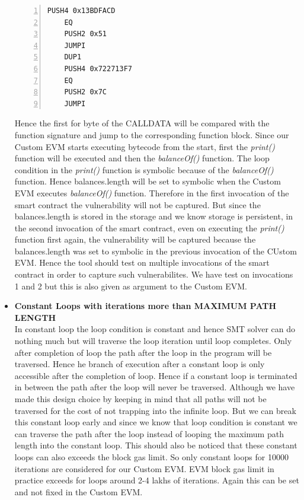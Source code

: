 \documentclass{article}
\begin{document}
\begin{itemize}
    \begin{Verbatim}[numbers=left,xleftmargin=5mm]
        PUSH4 0x13BDFACD 
	EQ 
	PUSH2 0x51 
	JUMPI 
	DUP1 
	PUSH4 0x722713F7 
	EQ 
	PUSH2 0x7C 
	JUMPI
    \end{Verbatim}
    Hence the first for byte of the CALLDATA will be compared with the function signature and jump to the corresponding function block. Since our Custom EVM starts executing bytecode from the start, first the \emph{print()} function will be executed and then the \emph{balanceOf()} function. The loop condition in the \emph{print()} function is symbolic because of the \emph{balanceOf()} function. Hence balances.length will be set to symbolic when the Custom EVM executes \emph{balanceOf()} function. Therefore in the first invocation of the smart contract the vulnerability will not be captured. But since the balances.length is stored in the storage and we know storage is persistent, in the second invocation of the smart contract, even on executing the \emph{print()} function first again, the vulnerability will be captured because the balances.length was set to symbolic in the previous invocation of the CUstom EVM. Hence the tool should test on multiple invocations of the smart contract in order to capture such vulnerabilites. We have test on invocations 1 and 2 but this is also given as argument to the Custom EVM.
    \item \textbf{Constant Loops with iterations more than MAXIMUM PATH LENGTH}\\
    In constant loop the loop condition is constant and hence SMT solver can do nothing much but will traverse the loop iteration until loop completes. Only after completion of loop the path after the loop in the program will be traversed. Hence he branch of execution after a constant loop is only accessible after the completion of loop. Hence if a constant loop is terminated in between the path after the loop will never be traversed. Although we have made this design choice by keeping in mind that all paths will not be traversed for the cost of not trapping into the infinite loop. But we can break this constant loop early and since we know that loop condition is constant we can traverse the path after the loop instead of looping the maximum path length into the constant loop.
    This should also be noticed that these constant loops can also exceeds the block gas limit. So only constant loops for 10000 iterations are considered for our Custom EVM. EVM block gas limit in practice exceeds for loops around 2-4 lakhs of iterations. Again this can be set and not fixed in the Custom EVM.
\end{itemize}
\end{document}
